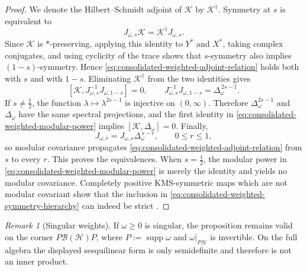 \documentclass[11pt]{article}
\theoremstyle{remark}
\newtheorem{remark}[remark]{Remark}
\newcommand{\1}{\mathbbm{1}}
\begin{document}
\begin{proof}
We denote the Hilbert--Schmidt adjoint of $\mathcal K$ by
$\mathcal K^\dagger$.  Symmetry at $s$ is equivalent to
\begin{equation}
 J_{\omega,s}\mathcal K
 =\mathcal K^\dagger J_{\omega,s}.
 \label{eq:consolidated-weighted-adjoint-relation}
\end{equation}
Since $\mathcal K$ is $*$-preserving, applying this identity to
$Y^*$ and $X^*$, taking complex conjugates, and using cyclicity of
the trace shows that $s$-symmetry also implies $(1-s)$-symmetry.
Hence \eqref{eq:consolidated-weighted-adjoint-relation} holds both
with $s$ and with $1-s$.  Eliminating
$\mathcal K^\dagger$ from the two identities gives
\begin{equation}
 \left[\mathcal K,
 J_{\omega,s}^{-1}J_{\omega,1-s}\right]=0,
 \qquad
 J_{\omega,s}^{-1}J_{\omega,1-s}
 =\Delta_\omega^{\,2s-1}.
 \label{eq:consolidated-weighted-modular-power}
\end{equation}
If $s\neq\frac12$, the function
$\lambda\mapsto\lambda^{2s-1}$ is injective on $(0,\infty)$.
Therefore $\Delta_\omega^{2s-1}$ and $\Delta_\omega$ have the same
spectral projections, and the first identity in
\eqref{eq:consolidated-weighted-modular-power} implies
$[\mathcal K,\Delta_\omega]=0$.  Finally,
\begin{equation}
 J_{\omega,r}=J_{\omega,s}\Delta_\omega^{\,s-r},
 \qquad 0\leq r\leq1,
 \label{eq:consolidated-weighted-propagation}
\end{equation}
so modular covariance propagates
\eqref{eq:consolidated-weighted-adjoint-relation} from $s$ to every
$r$.  This proves the equivalences.  When $s=\frac12$, the modular
power in \eqref{eq:consolidated-weighted-modular-power} is merely the
identity and yields no modular covariance.  Completely positive
KMS-symmetric maps which are not modular covariant show that the
inclusion in \eqref{eq:consolidated-weighted-symmetry-hierarchy} can
indeed be strict
\cite[Appendix~B]{carlen2017gradient}.
\end{proof}

\begin{remark}[Singular weights]
If $\omega\geq0$ is singular, the proposition remains valid on the
corner $P\mathcal B(\mathcal H)P$, where
$P:=\operatorname{supp}\omega$ and $\omega|_{P\mathcal H}$ is
invertible.  On the full algebra the displayed sesquilinear form is
only semidefinite and therefore is not an inner product.
\end{remark}
\end{document}
